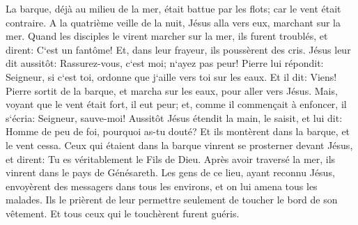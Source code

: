 \verse La barque, déjà au milieu de la mer, était battue par les flots; car le vent était contraire. 
\verse A la quatrième veille de la nuit, Jésus alla vers eux, marchant sur la mer. 
\verse Quand les disciples le virent marcher sur la mer, ils furent troublés, et dirent: C`est un fantôme! Et, dans leur frayeur, ils poussèrent des cris. 
\verse Jésus leur dit aussitôt: Rassurez-vous, c`est moi; n`ayez pas peur! 
\verse Pierre lui répondit: Seigneur, si c`est toi, ordonne que j`aille vers toi sur les eaux. 
\verse Et il dit: Viens! Pierre sortit de la barque, et marcha sur les eaux, pour aller vers Jésus. 
\verse Mais, voyant que le vent était fort, il eut peur; et, comme il commençait à enfoncer, il s`écria: Seigneur, sauve-moi! 
\verse Aussitôt Jésus étendit la main, le saisit, et lui dit: Homme de peu de foi, pourquoi as-tu douté? 
\verse Et ils montèrent dans la barque, et le vent cessa. 
\verse Ceux qui étaient dans la barque vinrent se prosterner devant Jésus, et dirent: Tu es véritablement le Fils de Dieu. 
\verse Après avoir traversé la mer, ils vinrent dans le pays de Génésareth. 
\verse Les gens de ce lieu, ayant reconnu Jésus, envoyèrent des messagers dans tous les environs, et on lui amena tous les malades. 
\verse Ils le prièrent de leur permettre seulement de toucher le bord de son vêtement. Et tous ceux qui le touchèrent furent guéris. 

\chapter{}

